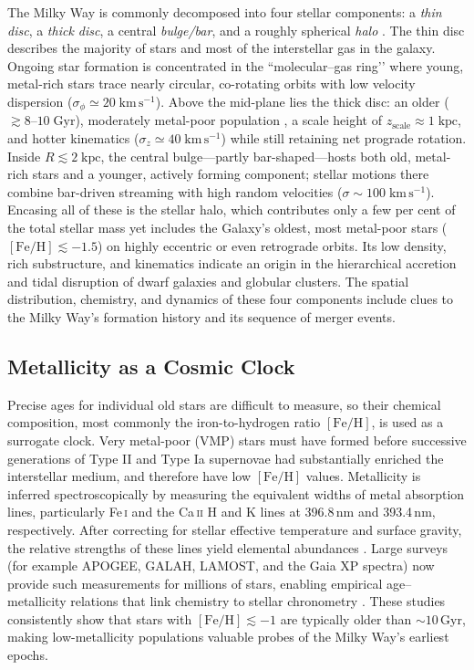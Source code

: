\documentclass[a4paper,12pt]{article}
\begin{document}
The Milky Way is commonly decomposed into four stellar components: a \emph{thin disc}, 
a \emph{thick disc}, a central \emph{bulge/bar}, and a roughly spherical \emph{halo} 
\citep{BlandHawthorn2016,Helmi2020}.  
The thin disc describes the majority of stars and most of the interstellar gas 
in the galaxy.  Ongoing star formation is concentrated in the “molecular–gas ring’’ where young, 
metal-rich stars trace nearly circular, co-rotating 
orbits with low velocity dispersion ($\sigma_\phi \simeq 20\;\mathrm{km\,s^{-1}}$).  
Above the mid-plane lies the thick disc: an older ($\gtrsim8$–$10\;\mathrm{Gyr}$), 
moderately metal-poor population , a scale 
height of $z_{\mathrm{scale}}\approx1\;\mathrm{kpc}$, and hotter kinematics 
($\sigma_z \simeq 40\;\mathrm{km\,s^{-1}}$) while still retaining net prograde rotation.  
Inside $R\lesssim2\;\mathrm{kpc}$, the central bulge—partly bar-shaped—hosts both 
old, metal-rich stars and a younger, actively forming component; stellar motions 
there combine bar-driven streaming with high random velocities 
($\sigma\sim100\;\mathrm{km\,s^{-1}}$).  
Encasing all of these is the stellar halo, which contributes only a few per cent 
of the total stellar mass yet includes the Galaxy’s oldest, most metal-poor stars 
($[\mathrm{Fe/H}]\lesssim-1.5$) on highly eccentric or even retrograde orbits.  
Its low density, rich substructure, and kinematics indicate an origin in the
 hierarchical accretion and tidal disruption of dwarf galaxies and globular clusters.  
The spatial distribution, chemistry, and dynamics of these four components 
include clues to the Milky Way’s formation history and its sequence of merger events.


\subsection{Metallicity as a Cosmic Clock}

Precise ages for individual old stars are difficult to measure, so their chemical 
composition, most commonly the iron-to-hydrogen ratio $[\mathrm{Fe/H}]$, is 
used as a surrogate clock.  
Very metal-poor (VMP) stars must have formed before successive generations of Type II 
and Type Ia supernovae had substantially enriched the interstellar medium, and 
therefore have low $[\mathrm{Fe/H}]$ values.  
Metallicity is inferred spectroscopically by measuring the equivalent widths of 
metal absorption lines, particularly Fe\,\textsc{i} and the Ca\,\textsc{ii} H and 
K lines at 396.8\,nm and 393.4\,nm, respectively. After correcting for stellar 
effective temperature and surface gravity, the relative strengths of these lines 
yield elemental abundances \citep{Gray_2005}.
Large surveys (for example APOGEE, GALAH, LAMOST, and the Gaia XP spectra) now 
provide such measurements for millions of stars, enabling empirical age–metallicity 
relations that link chemistry to stellar chronometry 
\citep[e.g.][]{Nordstrom2004,Haywood2013,leung2019deep,Anders2023}.  
These studies consistently show that stars with $[\mathrm{Fe/H}]\lesssim -1$ are 
typically older than $\sim10$\,Gyr, making low-metallicity populations valuable 
probes of the Milky Way’s earliest epochs.
\end{document}
